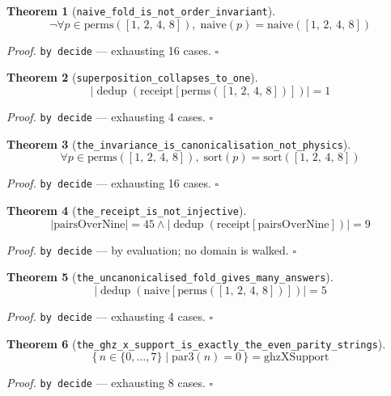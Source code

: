 \documentclass[11pt]{article}
\newtheorem{theorem}{Theorem}[section]
\begin{document}
\begin{theorem}[\texttt{naive\_fold\_is\_not\_order\_invariant}]
\[ \lnot \forall p \in \mathrm{perms}\mathopen{}\left([1,\,2,\,4,\,8]\right),\; \mathrm{naive}\mathopen{}\left(p\right) = \mathrm{naive}\mathopen{}\left([1,\,2,\,4,\,8]\right) \]
\end{theorem}
\noindent\emph{Proof.} \texttt{by decide} --- exhausting 16 cases. \hfill$\square$

\begin{theorem}[\texttt{superposition\_collapses\_to\_one}]
\[ \left|\operatorname{dedup}\left(\mathrm{receipt}[\mathrm{perms}\mathopen{}\left([1,\,2,\,4,\,8]\right)]\right)\right| = 1 \]
\end{theorem}
\noindent\emph{Proof.} \texttt{by decide} --- exhausting 4 cases. \hfill$\square$

\begin{theorem}[\texttt{the\_invariance\_is\_canonicalisation\_not\_physics}]
\[ \forall p \in \mathrm{perms}\mathopen{}\left([1,\,2,\,4,\,8]\right),\; \mathrm{sort}\mathopen{}\left(p\right) = \mathrm{sort}\mathopen{}\left([1,\,2,\,4,\,8]\right) \]
\end{theorem}
\noindent\emph{Proof.} \texttt{by decide} --- exhausting 16 cases. \hfill$\square$

\begin{theorem}[\texttt{the\_receipt\_is\_not\_injective}]
\[ \left|\mathrm{pairsOverNine}\right| = 45 \land \left|\operatorname{dedup}\left(\mathrm{receipt}[\mathrm{pairsOverNine}]\right)\right| = 9 \]
\end{theorem}
\noindent\emph{Proof.} \texttt{by decide} --- by evaluation; no domain is walked. \hfill$\square$

\begin{theorem}[\texttt{the\_uncanonicalised\_fold\_gives\_many\_answers}]
\[ \left|\operatorname{dedup}\left(\mathrm{naive}[\mathrm{perms}\mathopen{}\left([1,\,2,\,4,\,8]\right)]\right)\right| = 5 \]
\end{theorem}
\noindent\emph{Proof.} \texttt{by decide} --- exhausting 4 cases. \hfill$\square$

\begin{theorem}[\texttt{the\_ghz\_x\_support\_is\_exactly\_the\_even\_parity\_strings}]
\[ \{\, n \in \{0,\dots,7\} \mid \mathrm{par3}\mathopen{}\left(n\right) = 0 \,\} = \mathrm{ghzXSupport} \]
\end{theorem}
\noindent\emph{Proof.} \texttt{by decide} --- exhausting 8 cases. \hfill$\square$
\end{document}
